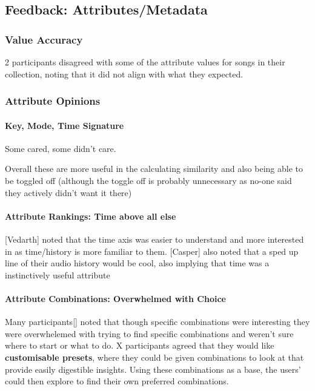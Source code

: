 \subsection{Feedback: Attributes/Metadata}

\subsubsection{Value Accuracy}
2 participants disagreed with some of the attribute values for songs in their collection, noting that it did not align with what they expected.

\subsubsection{Attribute Opinions}
\paragraph{Key, Mode, Time Signature}%
Some cared, some didn't care.

Overall these are more useful in the calculating similarity and also being able to be toggled off (although the toggle off is probably unnecessary as no-one said they actively didn't want it there)

\paragraph{Attribute Rankings: Time above all else}%
[Vedarth] noted that the time axis was easier to understand and more interested in as time/history is more familiar to them. [Casper] also noted that a sped up line of their audio history would be cool, also implying that time was a instinctively useful attribute

\paragraph{Attribute Combinations: Overwhelmed with Choice}%
Many participants[] noted that though specific combinations were interesting they were overwhelemed with trying to find specific combinations and weren't sure where to start or what to do.
X participants agreed that they would like \textbf{customisable presets}, where they could be given combinations to look at that provide easily digestible insights. Using these combinations as a base, the users' could then explore to find their own preferred combinations.

